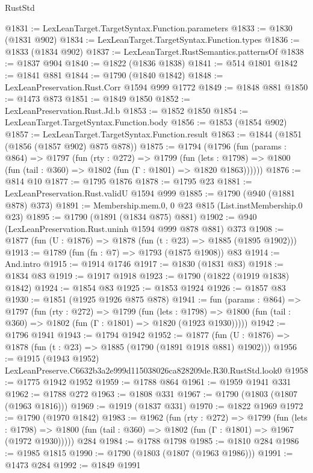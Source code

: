 \begin{lexlean}{RustStd}
\begin{coremodule}
@1831 := LexLeanTarget.TargetSyntax.Function.parameters
@1833 := @1830 (@1831 @902)
@1834 := LexLeanTarget.TargetSyntax.Function.types
@1836 := @1833 (@1834 @902)
@1837 := LexLeanTarget.RustSemantics.patternsOf
@1838 := @1837 @904
@1840 := @1822 (@1836 @1838)
@1841 := @514 @1801
@1842 := @1841 @881
@1844 := @1790 (@1840 @1842)
@1848 := LexLeanPreservation.Rust.Corr @1594 @999 @1772
@1849 := @1848 @881
@1850 := @1473 @873
@1851 := @1849 @1850
@1852 := LexLeanPreservation.Rust.Jd.b
@1853 := @1852 @1850
@1854 := LexLeanTarget.TargetSyntax.Function.body
@1856 := @1853 (@1854 @902)
@1857 := LexLeanTarget.TargetSyntax.Function.result
@1863 := @1844 (@1851 (@1856 (@1857 @902) @875 @878))
@1875 := @1794
    (@1796
      (fun (params : @864) =>
      @1797
        (fun (rty : @272) =>
        @1799
          (fun (lets : @1798) =>
          @1800 (fun (tail : @360) => @1802 (fun (Γ : @1801) => @1820 @1863))))))
@1876 := @814 @10
@1877 := @1795 @1876
@1878 := @1795 @23
@1881 := LexLeanPreservation.Rust.validU @1594 @999
@1885 := @1790 (@940 (@1881 @878) @373)
@1891 := Membership.mem.{0, 0} @23 @815 (List.instMembership.{0} @23)
@1895 := @1790 (@1891 (@1834 @875) @881)
@1902 := @940 (LexLeanPreservation.Rust.uninh @1594 @999 @878 @881) @373
@1908 := @1877 (fun (U : @1876) => @1878 (fun (t : @23) => @1885 (@1895 @1902)))
@1913 := @1789 (fun (fn : @7) => @1793 (@1875 @1908)) @83
@1914 := And.intro
@1915 := @1914 @1746
@1917 := @1830 (@1831 @83)
@1918 := @1834 @83
@1919 := @1917 @1918
@1923 := @1790 (@1822 (@1919 @1838) @1842)
@1924 := @1854 @83
@1925 := @1853 @1924
@1926 := @1857 @83
@1930 := @1851 (@1925 @1926 @875 @878)
@1941 := fun (params : @864) =>
  @1797
    (fun (rty : @272) =>
    @1799
      (fun (lets : @1798) =>
      @1800 (fun (tail : @360) => @1802 (fun (Γ : @1801) => @1820 (@1923 @1930)))))
@1942 := @1796 @1941
@1943 := @1794 @1942
@1952 := @1877 (fun (U : @1876) => @1878 (fun (t : @23) => @1885 (@1790 (@1891 @1918 @881) @1902)))
@1956 := @1915 (@1943 @1952) LexLeanPreserve.C6632b3a2e999d115038026ca828209de.R30.RustStd.look0
@1958 := @1775 @1942 @1952
@1959 := @1788 @864
@1961 := @1959 @1941 @331
@1962 := @1788 @272
@1963 := @1808 @331
@1967 := @1790 (@1803 (@1807 (@1963 @1816)))
@1969 := @1919 (@1837 @331)
@1970 := @1822 @1969
@1972 := @1790 (@1970 @1842)
@1983 := @1962
    (fun (rty : @272) =>
    @1799
      (fun (lets : @1798) =>
      @1800 (fun (tail : @360) => @1802 (fun (Γ : @1801) => @1967 (@1972 @1930)))))
    @284
@1984 := @1788 @1798
@1985 := @1810 @284
@1986 := @1985 @1815
@1990 := @1790 (@1803 (@1807 (@1963 @1986)))
@1991 := @1473 @284
@1992 := @1849 @1991

\end{coremodule}
\end{lexlean}
